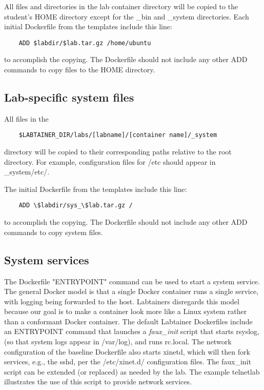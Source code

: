 \documentclass{article}
\begin{document}
All files and directories in the lab container directory will be copied to the student's HOME
directory except for the \_bin and \_system directories.
Each initial Dockerfile from the templates include this line:
\begin{verbatim}
    ADD $labdir/$lab.tar.gz /home/ubuntu
\end{verbatim}
to accomplish the copying. The Dockerfile should not include any other ADD commands
to copy files to the HOME directory.

\subsection{Lab-specific system files}
All files in the
\begin{verbatim}
    $LABTAINER_DIR/labs/[labname]/[container name]/_system
\end{verbatim}
directory will be copied to their corresponding paths relative to the root directory.
For example, configuration files for /etc should appear in \_system/etc/.

The initial Dockerfile from the templates include this line:
\begin{verbatim}
    ADD \$labdir/sys_\$lab.tar.gz /
\end{verbatim}
to accomplish the copying. The Dockerfile should not include any other ADD commands
to copy system files.

\subsection {System services}
The Dockerfile "ENTRYPOINT" command can be used to start a system service.  The general Docker 
model is that a single Docker container runs a single service, with logging being forwarded to 
the host.  Labtainers disregards this model because our goal is to make a container look more like a Linux
system rather than a conformant Docker container.  The default Labtainer Dockerfiles include an
ENTRYPOINT command that launches a \textit{faux\_init} script that starts rsyslog, (so that system logs
appear in /var/log), and runs rc.local.  The network configuration of the baseline Dockerfile also starts xinetd,
which will then fork services, e.g., the sshd, per the /etc/xinet.d/ configuration files.  The faux\_init script
can be extended (or replaced) as needed by the lab.  The example telnetlab illustrates the use of this script
to provide network services.
\end{document}
